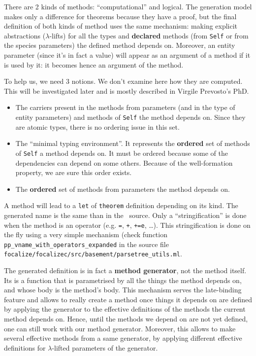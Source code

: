 There are 2 kinds of methods: ``computational'' and logical. The
generation model makes only a difference for theorems because they
have a proof, but the final definition of both kinds of method uses
the same mechanism: making explicit abstractions ($\lambda$-lifts) for
all the types and {\bf declared} methods (from {\tt Self} or from the
species parameters) the defined method depends on. Moreover, an entity
parameter (since it's in fact a value) will appear as an argument of a
method if it is used by it: it becomes hence an argument of the
method.

To help us, we need 3 notions. We don't examine here how they are
computed. This will be investigated later and is mostly described in
Virgile Prevosto's PhD.
\begin{itemize}
\item The carriers present in the methods from parameters (and in the
  type of entity parameters) and methods of {\tt Self} the method
  depends on. Since they are atomic types, there is no ordering issue
  in this set.
\item The ``minimal typing environment''. It represents the
  {\bf ordered} set of methods of {\tt Self} a method depends on. It
  must be ordered because some of the dependencies can depend on some
  others. Because of the well-formation property, we are sure this
  order exists.
\item The {\bf ordered} set of methods from parameters the method
  depends on.
\end{itemize}

A method will lead to a {\tt let} of {\tt theorem} definition
depending on its kind. The generated name is the same than in the
\focalize\ source.
\label{ident-stringification}
Only a ``stringification'' is done when the method
is an operator (e.g. {\tt =}, {\tt +}, {\tt +=e}, \ldots). This
stringification is done on the fly using a very simple mechanism
(check function \\
{\tt pp\_vname\_with\_operators\_expanded} in the source
file \\
{\tt focalize/focalizec/src/basement/parsetree\_utils.ml}.

The generated definition is in fact a {\bf method generator}, not the
method itself. Its is a function that is parametrised by all the things
the method depends on, and whose body is the method's body. This
mechanism serves the late-binding feature and allows to really create a
method once things it depends on are defined by applying the generator
to the effective definitions of the methods the current method depends
on. Hence, until the methods we depend on are not yet defined, one can
still work with our method generator. Moreover, this allows to make
several effective methods from a same generator, by applying
different effective definitions for $\lambda$-lifted  parameters of
the generator.

